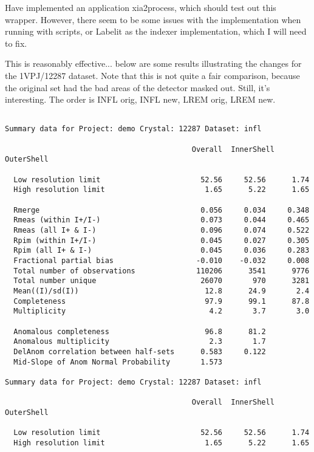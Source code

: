 \documentclass[a4paper, 11pt]{article}
\begin{document}
Have implemented an application xia2process, which should test out this 
wrapper. However, there seem to be some issues with the implementation 
when running with scripts, or Labelit as the indexer implementation, 
which I will need to fix.

This is reasonably effective... below are some results illustrating the 
changes for the 1VPJ/12287 dataset. Note that this is not quite a fair
comparison, because the original set had the bad areas of the detector
masked out. Still, it's interesting. The order is INFL orig, INFL new,
LREM orig, LREM new.

{
\small
\begin{verbatim}

Summary data for Project: demo Crystal: 12287 Dataset: infl

                                           Overall  InnerShell OuterShell

  Low resolution limit                       52.56     52.56      1.74
  High resolution limit                       1.65      5.22      1.65

  Rmerge                                     0.056     0.034     0.348
  Rmeas (within I+/I-)                       0.073     0.044     0.465
  Rmeas (all I+ & I-)                        0.096     0.074     0.522
  Rpim (within I+/I-)                        0.045     0.027     0.305
  Rpim (all I+ & I-)                         0.045     0.036     0.283
  Fractional partial bias                   -0.010    -0.032     0.008
  Total number of observations              110206      3541      9776
  Total number unique                        26070       970      3281
  Mean((I)/sd(I))                             12.8      24.9       2.4
  Completeness                                97.9      99.1      87.8
  Multiplicity                                 4.2       3.7       3.0

  Anomalous completeness                      96.8      81.2
  Anomalous multiplicity                       2.3       1.7
  DelAnom correlation between half-sets      0.583     0.122
  Mid-Slope of Anom Normal Probability       1.573

Summary data for Project: demo Crystal: 12287 Dataset: infl

                                           Overall  InnerShell OuterShell

  Low resolution limit                       52.56     52.56      1.74
  High resolution limit                       1.65      5.22      1.65


\end{verbatim}}
\end{document}
